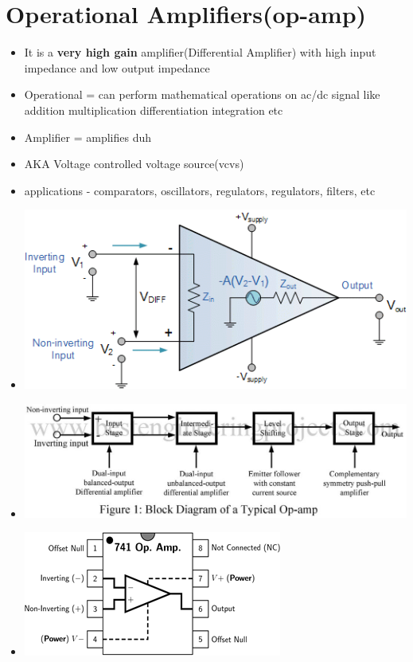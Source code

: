 \documentclass[10pt, a4paper]{report}
\begin{document}
	\chapter{Operational Amplifiers(op-amp)}
	\begin{itemize}
		\item It is a \textbf{very high gain} amplifier(Differential Amplifier) with high input impedance and low output impedance
		\item Operational = can perform mathematical operations on ac/dc signal like addition multiplication differentiation integration etc
		\item Amplifier = amplifies duh
		\item AKA Voltage controlled voltage source(vcvs)
		\item applications - comparators, oscillators, regulators, regulators, filters, etc
		\item \includegraphics[width=0.7\linewidth]{img/opamp}
		\item \includegraphics[width=\linewidth]{img/opamp block}
		\item \includegraphics[width=0.7\linewidth]{img/opamp pins}
	\end{itemize}
\end{document}

